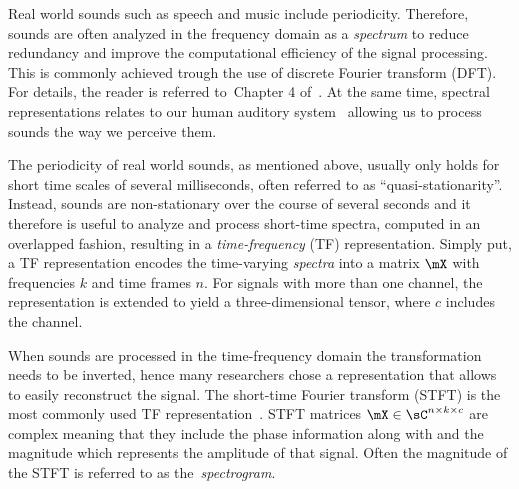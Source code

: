 Real world sounds such as speech and music include periodicity.
Therefore, sounds are often analyzed in the frequency domain as a \emph{spectrum} to reduce redundancy and improve the computational efficiency of the signal processing.
This is commonly achieved trough the use of discrete Fourier transform (DFT). 
For details, the reader is referred to~Chapter 4 of~\cite{proakis96}.
At the same time, spectral representations relates to our human auditory system~\cite{zwicker13, moore89, bregman90} allowing us to process sounds the way we perceive them.
\par
The periodicity of real world sounds, as mentioned above, usually only holds for short time scales of several milliseconds, often referred to as ``quasi-stationarity''.
Instead, sounds are non-stationary over the course of several seconds and it therefore is useful to analyze and process short-time spectra, computed in an overlapped fashion, resulting in a \emph{time-frequency} (TF) representation.
Simply put, a TF representation encodes the time-varying \textit{spectra} into a matrix \(\mX\) with frequencies \(k\) and time frames \(n\).
For signals with more than one channel, the representation is extended to yield a three-dimensional tensor, where \(c\) includes the channel.
\par
When sounds are processed in the time-frequency domain the transformation needs to be inverted, hence many researchers chose a representation that allows to easily reconstruct the signal.
The short-time Fourier transform (STFT) is the most commonly used TF representation~\cite{mcaulay86}.
STFT matrices \(\mX \in \sC^{n \times k \times c}\) are complex meaning that they include the phase information along with and the magnitude which represents the amplitude of that signal.
Often the magnitude of the STFT is referred to as the~\emph{spectrogram}.

